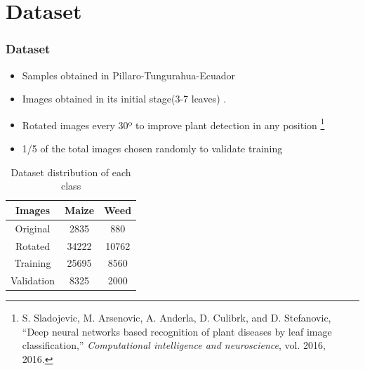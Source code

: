 \documentclass[10pt,a4paper]{beamer}
\begin{document}
\section{Dataset}
\begin{frame}
\frametitle{Dataset}
\begin{itemize}
\item Samples obtained in Pillaro-Tungurahua-Ecuador
\item Images obtained in its initial stage(3-7 leaves) . %
\item Rotated images every 30º to improve plant detection in any position \footnote{ S. Sladojevic, M. Arsenovic, A. Anderla, D. Culibrk, and D. Stefanovic, “Deep neural networks based recognition of plant diseases by leaf image classification,” \textit{Computational intelligence and neuroscience}, vol. 2016, 2016.
}%
\item 1/5 of the total images chosen randomly to validate training%
\end{itemize}
\begin{table}[h!]
\renewcommand{\arraystretch}{1.3}
\caption{Dataset distribution of each class}
\label{table:1}
\centering
\begin{tabular}{| c c c |} 
 \hline
 \textbf{Images} & \textbf{Maize} & \textbf{Weed}  \\ [1ex] 
 \hline
 Original  & 2835 & 880 \\ 
 Rotated & 34222 & 10762 \\ 
 Training & 25695 & 8560 \\
 Validation & 8325 & 2000 \\
 \hline
\end{tabular}
\end{table}
\end{frame}
\end{document}
